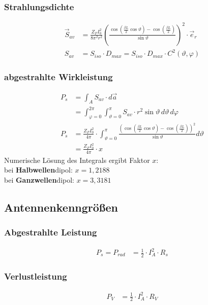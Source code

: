 \subsubsection{Strahlungsdichte}
\begin{align*}
    \vec{S}_{av} & = \frac{Z_FI_0^2}{8\pi^2 r^2}\left(\frac{\cos\left(\frac{\beta L}{2}\cos\vartheta\right)-\cos\left(\frac{\beta L}{2}\right)}{\sin\vartheta}\right)^2\cdot\vec{e}_r                               \\
    S_{av} & = S_{iso} \cdot D_{max} = S_{iso} \cdot D_{max} \cdot C^2(\vartheta, \varphi)
\end{align*}
\subsubsection{abgestrahlte Wirkleistung}
\begin{align*}
                P_{s} & = \int_A S_{av}\cdot d\vec{a}                                                                                                                                                              \\
                 & = \int^{2\pi}_{\varphi = 0}\int^{\pi}_{\vartheta = 0} S_{av}\cdot r^2 \sin\vartheta \, d\vartheta \, d\varphi\\
 P_{s}          & = \frac{Z_{F}I_0^2}{4\pi}\cdot\int^{\pi}_{\vartheta=0}\frac{\left(\cos\left(\frac{\beta L}{2}\cos\vartheta\right)-\cos\left(\frac{\beta L}{2}\right)\right)^2}{\sin\vartheta}d\vartheta\\
 &= \frac{Z_{F}I_0^2}{4\pi}\cdot x
\end{align*}
Numerische Lösung des Integrals ergibt Faktor $ x $:\\
bei \textbf{Halbwellen}dipol: $ x=1,2188 $\\
bei \textbf{Ganzwellen}dipol: $ x=3,3181$
\subsection{Antennenkenngrößen}



\subsubsection{Abgestrahlte Leistung}
\begin{align*}
    P_s = P_{rad} & = \frac{1}{2}\cdot I_A^2 \cdot R_s
\end{align*}
\subsubsection{Verlustleistung}
\begin{align*}
    P_V & = \frac{1}{2}\cdot I_A^2\cdot R_V
\end{align*}
